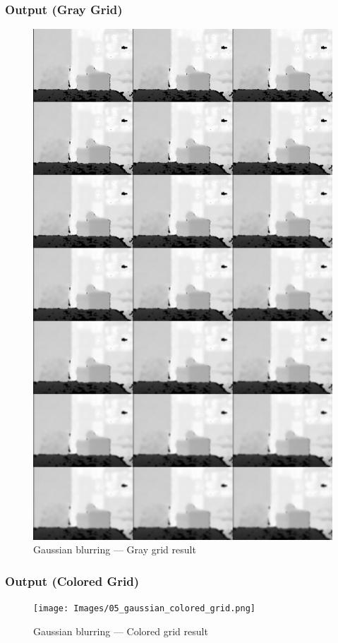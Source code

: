 \documentclass[a4paper,11pt]{article}
\begin{document}
	\subsubsection*{Output (Gray Grid)}
	\begin{figure}[H]
		\centering
		\includegraphics[width=\textwidth,height=0.9\textheight,keepaspectratio]{Images/05_gaussian_gray_grid.png}
		\caption{Gaussian blurring — Gray grid result}
	\end{figure}
	\clearpage
	
	\subsubsection*{Output (Colored Grid)}
	\begin{figure}[H]
		\centering
		\texttt{[image: Images/05\_gaussian\_colored\_grid.png]}
		\caption{Gaussian blurring — Colored grid result}
	\end{figure}
	\clearpage
	
\end{document}
